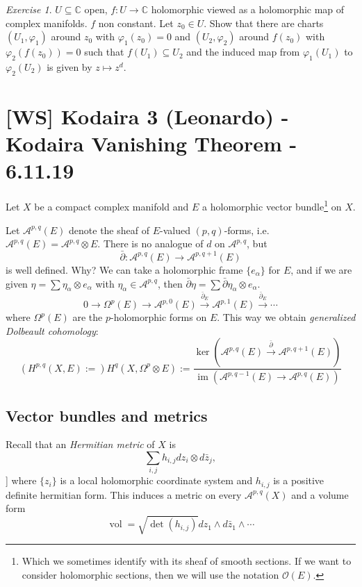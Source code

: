 \documentclass[12pt]{article}
\theoremstyle{darkgreentheorem}
\theoremstyle{darkbluedefinition}
\theoremstyle{darkredexample}
\theoremstyle{remark}
\newtheorem{exe}[thm]{Exercise}
\newcommand{\1}{\mathbbm{1}}
\newcommand{\C}{\mathbb{C}}
\newcommand{\A}{\mathscr{A}}
\renewcommand{\O}{\mathcal{O}}
\DeclareMathOperator{\im}{im}
\DeclareMathOperator{\vol}{vol}
\newcommand{\ot}{\otimes}
\newcommand{\sub}{\subseteq}
\begin{document}
\begin{exe}
    $U\sub\C$ open, $f\colon U\to \C$ holomorphic viewed as a holomorphic map of complex manifolds.
    $f$ non constant.
    Let $z_{0}\in U$.
    Show that there are charts $(U_{1},\varphi_{1})$ around $z_{0}$ with $\varphi_{1}(z_{0})=0$ and $(U_{2},\varphi_{2})$ around $f(z_{0})$ with $\varphi_{2}(f(z_{0}))=0$ such that $f(U_{1})\sub U_{2}$ and the induced map from $\varphi_{1}(U_{1})$ to $\varphi_{2}(U_{2})$ is given by $z\mapsto z^{d}$.
\end{exe}

\section{[WS] Kodaira 3 (Leonardo) - Kodaira Vanishing Theorem - 6.11.19}

Let $X$ be a compact complex manifold and $E$ a holomorphic vector bundle\footnote{Which we sometimes identify with its sheaf of smooth sections. If we want to consider holomorphic sections, then we will use the notation $\O(E)$.} on $X$.

Let $\A^{p,q}(E)$ denote the sheaf of $E$-valued $(p,q)$-forms, i.e. $\A^{p,q}(E)=\A^{p,q}\ot E$.
There is no analogue of $d$ on $\A^{p,q}$, but
\[ \bar{\partial }\colon \A^{p,q}(E)\to \A^{p,q+1}(E) \]
is well defined.
Why?
We can take a holomorphic frame $\{ e_{\alpha}\}$ for $E$, and if we are given $\eta=\sum \eta_{\alpha}\ot e_{\alpha}$ with $\eta_{\alpha}\in \A^{p,q}$, then $\bar{\partial }\eta=\sum\bar{\partial}\eta_{\alpha}\ot e_{\alpha}$.
\[ 0\to \Omega^{p}(E)\to \A^{p,0}(E)\xrightarrow{\bar{\partial}_{E}} \A^{p,1}(E)\xrightarrow{\bar{\partial}_{E}}\cdots \]
where $\Omega^{p}(E)$ are the $p$-holomorphic forms on $E$.
This way we obtain \textit{generalized Dolbeault cohomology}:
\[ (H^{p,q}(X,E):=)H^{q}(X,\Omega^{p}\ot E):=\frac{\ker(\A^{p,q}(E)\xrightarrow{\bar{\partial}}\A^{p,q+1}(E))}{\im(\A^{p,q-1}(E)\to \A^{p,q}(E))} \]

\subsection{Vector bundles and metrics}

Recall that an \textit{Hermitian metric} of $X$ is
\[ \sum_{i,j}h_{i,j}dz_{i}\ot d\bar{z}_{j},\]]
where $\{z_{i}\}$ is a local holomorphic coordinate system and $h_{i,j}$ is a positive definite hermitian form.
This induces a metric on every $\A^{p,q}(X)$ and a volume form
\[ \vol=\sqrt{\det(h_{i,j})}dz_{1}\wedge d\bar{z}_{1}\wedge \cdots \]
\end{document}
